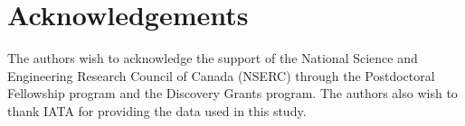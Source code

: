 \documentclass[preprint,times]{elsarticle}
\def\mfabian#1{{\color{black} #1}}
\begin{document}


\section*{Acknowledgements}

\mfabian{The authors wish to acknowledge the support of the National Science and Engineering Research Council of Canada (NSERC) through the Postdoctoral Fellowship program and the Discovery Grants program. The authors also wish to thank IATA for providing the data used in this study.}







\end{document}
